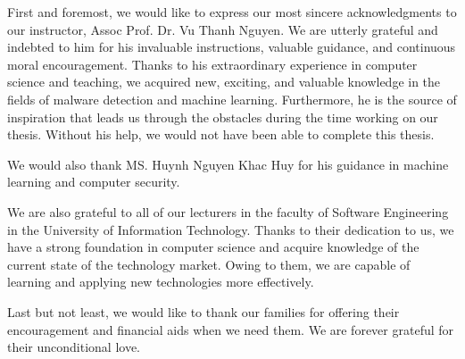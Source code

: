 
\begin{acknowledgements}      

First and foremost, we would like to express our most sincere acknowledgments to our instructor, Assoc Prof. Dr.  Vu Thanh Nguyen. We are utterly grateful and indebted to him for his invaluable instructions, valuable guidance, and continuous moral encouragement. Thanks to his extraordinary experience in computer science and teaching, we acquired new, exciting, and valuable knowledge in the fields of malware detection and machine learning. Furthermore, he is the source of inspiration that leads us through the obstacles during the time working on our thesis. Without his help, we would not have been able to complete this thesis.

We would also thank MS. Huynh Nguyen Khac Huy for his guidance in machine learning and computer security.

We are also grateful to all of our lecturers in the faculty of Software Engineering in the University of Information Technology. Thanks to their dedication to us, we have a strong foundation in computer science and acquire knowledge of the current state of the technology market. Owing to them, we are capable of learning and applying new technologies more effectively.

Last but not least, we would like to thank our families for offering their encouragement and financial aids when we need them. We are forever grateful for their unconditional love. 

\end{acknowledgements}
